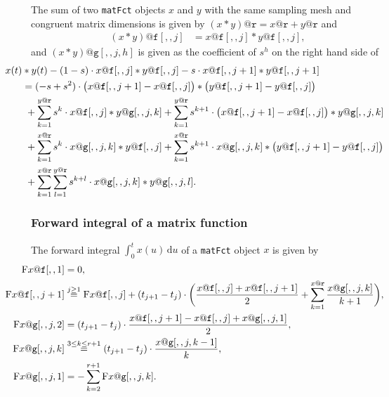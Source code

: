 \documentclass[12pt,a4paper]{article}
\newcommand{\df}{\text{d}}
\begin{document}
The sum of two \texttt{matFct} objects $x$ and $y$ with the same sampling mesh and congruent matrix dimensions is given by $(x*y)@\texttt{r} = x@\texttt{r} + y@\texttt{r}$ and
\begin{align*}
(x*y)@\texttt{f}[,,j] &= x@\texttt{f}[,,j] * y@\texttt{f}[,,j],
\end{align*}
and $(x*y)@\texttt{g}[,,j,h]$ is given as the coefficient of $s^h$ on the right hand side of
\begin{equation*}
\hspace{-1cm}
\begin{aligned}
x(t) &* y(t) - (1-s) \cdot x@\texttt{f}[,,j] * y@\texttt{f}[,,j] - s \cdot x@\texttt{f}[,,j+1] * y@\texttt{f}[,,j+1] \\
&= (-s+s^2) \cdot \big( x@\texttt{f}[,,j+1] - x@\texttt{f}[,,j] \big) * \big( y@\texttt{f}[,,j+1] - y@\texttt{f}[,,j] \big) \\
&\ + \sum_{k=1}^{y@\texttt{r}} s^k \cdot x@\texttt{f}[,,j] * y@\texttt{g}[,,j,k]
+ \sum_{k=1}^{y@\texttt{r}} s^{k+1} \cdot \big( x@\texttt{f}[,,j+1] - x@\texttt{f}[,,j] \big) * y@\texttt{g}[,,j,k] \\
&\ + \sum_{k=1}^{x@\texttt{r}} s^k \cdot x@\texttt{g}[,,j,k] * y@\texttt{f}[,,j]
+ \sum_{k=1}^{x@\texttt{r}} s^{k+1} \cdot x@\texttt{g}[,,j,k] * \big( y@\texttt{f}[,,j+1] - y@\texttt{f}[,,j] \big) \\
&\ + \sum_{k=1}^{x@\texttt{r}} \sum_{l=1}^{y@\texttt{r}} s^{k+l}\cdot x@\texttt{g}[,,j,k] * y@\texttt{g}[,,j,l].
\end{aligned}
\end{equation*}

\subsubsection{Forward integral of a matrix function}

The forward integral $\int_0^t x(u)\, \df u$ of a \texttt{matFct} object $x$ is given by
\begin{equation*}
\hspace{-1cm}
\begin{aligned}
\mathrm{F}x@\texttt{f}[,,1] &= 0, \\
\mathrm{F}x@\texttt{f}[,,j+1] &\overset{j \ge 1}{=} \mathrm{F}x@\texttt{f}[,,j] + (t_{j+1} - t_j) \cdot \bigg( \frac{x@\texttt{f}[,,j] + x@\texttt{f}[,,j+1]}{2} + \sum_{k=1}^{x@\texttt{r}} \frac{x@\texttt{g}[,,j,k]}{k+1} \bigg), \\
\mathrm{F}x@\texttt{g}[,,j,2] &= (t_{j+1}-t_j) \cdot \frac{x@\texttt{f}[,,j+1] - x@\texttt{f}[,,j] + x@\texttt{g}[,,j,1]}{2}, \\
\mathrm{F}x@\texttt{g}[,,j,k] &\overset{3 \le k \le r+1}{=} (t_{j+1}-t_j) \cdot \frac{x@\texttt{g}[,,j,k-1]}{k}, \\
\mathrm{F}x@\texttt{g}[,,j,1] &= -\sum_{k=2}^{r+1} \mathrm{F}x@\texttt{g}[,,j,k].
\end{aligned}
\end{equation*}
\end{document}
